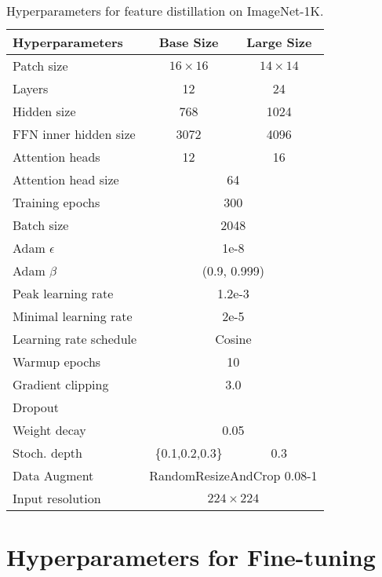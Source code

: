 \documentclass{article}
\newcommand{\xmark}{\ding{55}}
\begin{document}
\begin{table}[H]
    \centering
    \caption{
    Hyperparameters for feature distillation on ImageNet-1K.
    }
    \begin{tabular}{l|cc}
    \toprule
        \bf Hyperparameters & \bf Base Size & \bf Large Size \\
        \midrule
            Patch size & $16 \times 16$ & $14 \times 14$ \\
            Layers  & 12 & 24 \\
            Hidden size & 768 & 1024 \\
            FFN inner hidden size & 3072 & 4096 \\
            Attention heads & 12 & 16 \\
            Attention head size & \multicolumn{2}{c}{64} \\
        \midrule
            Training epochs & \multicolumn{2}{c}{300} \\
            Batch size & \multicolumn{2}{c}{2048} \\
            Adam $\epsilon$ & \multicolumn{2}{c}{1e-8} \\
            Adam $\beta$ & \multicolumn{2}{c}{(0.9, 0.999)} \\
            Peak learning rate & \multicolumn{2}{c}{1.2e-3} \\
            Minimal learning rate & \multicolumn{2}{c}{2e-5} \\
            Learning rate schedule & \multicolumn{2}{c}{Cosine} \\
            Warmup epochs & \multicolumn{2}{c}{10} \\
        \midrule
            Gradient clipping & \multicolumn{2}{c}{3.0} \\
            Dropout & \multicolumn{2}{c}{\xmark} \\
            Weight decay & \multicolumn{2}{c}{0.05} \\
            Stoch. depth & \{0.1,0.2,0.3\} & 0.3 \\
        \midrule
            Data Augment & \multicolumn{2}{c}{RandomResizeAndCrop 0.08-1} \\
            Input resolution & \multicolumn{2}{c}{$224 \times 224$} \\
        \bottomrule
    \end{tabular}
    \label{tab:appd-hyper-pretrain}
\end{table}

\section{Hyperparameters for Fine-tuning}
\end{document}
